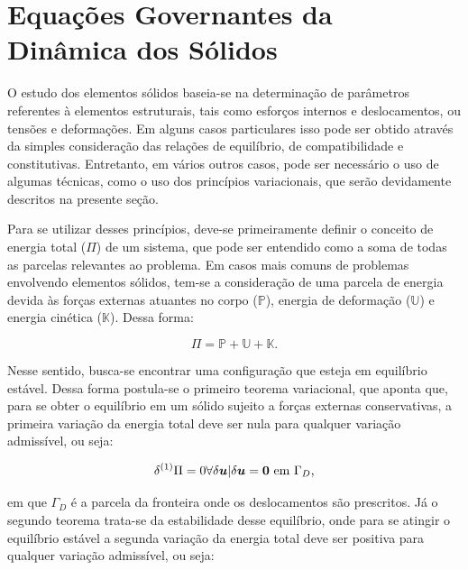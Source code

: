 \section{Equações Governantes da Dinâmica dos Sólidos} \label{EGDS}

O estudo dos elementos sólidos baseia-se na determinação de parâmetros referentes à elementos estruturais, tais como esforços internos e deslocamentos, ou tensões e deformações. Em alguns casos particulares isso pode ser obtido através da simples consideração das relações de equilíbrio, de compatibilidade e constitutivas. Entretanto, em vários outros casos, pode ser necessário o uso de algumas técnicas, como o uso dos princípios variacionais, que serão devidamente descritos na presente seção.

Para se utilizar desses princípios, deve-se primeiramente definir o conceito de energia total ($\Pi$) de um sistema, que pode ser entendido como a soma de todas as parcelas relevantes ao problema. Em casos mais comuns de problemas envolvendo elementos sólidos, tem-se a consideração de uma parcela de energia devida às forças externas atuantes no corpo ($\mathbb{P}$), energia de deformação ($\mathbb{U}$) e energia cinética ($\mathbb{K}$). Dessa forma:

\begin{equation}
    \Pi=\mathbb{P}+\mathbb{U}+\mathbb{K}\text{.}
\end{equation}

Nesse sentido, busca-se encontrar uma configuração que esteja em equilíbrio estável. Dessa forma postula-se o primeiro teorema variacional, que aponta que, para se obter o equilíbrio em um sólido sujeito a forças externas conservativas, a primeira variação da energia total deve ser nula para qualquer variação admissível, ou seja:

\begin{equation}
    \delta^{(1)}\Pi=0\forall\delta\boldsymbol{u}|\delta\boldsymbol{u}=\boldsymbol{0}\text{ em }\Gamma_D\text{,}
\end{equation}

\noindent em que $\Gamma_D$ é a parcela da fronteira onde os deslocamentos são prescritos. Já o segundo teorema trata-se da estabilidade desse equilíbrio, onde para se atingir o equilíbrio estável a segunda variação da energia total deve ser positiva para qualquer variação admissível, ou seja:

